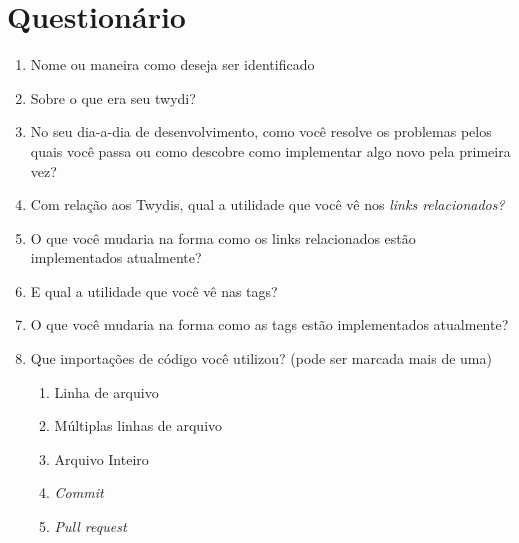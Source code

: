 \apendice
\chapter{Questionário}

\begin{enumerate}
  \item \hspace{1pt} Nome ou maneira como deseja ser identificado

  \item \hspace{1pt} Sobre o que era seu twydi?

  \item \hspace{1pt} No seu dia-a-dia de desenvolvimento, como você resolve os problemas pelos quais você passa ou como descobre como implementar algo novo pela primeira vez?

  \item \hspace{1pt} Com relação aos Twydis, qual a utilidade que você vê nos \textit{links relacionados?}

  \item \hspace{1pt} O que você mudaria na forma como os links relacionados estão implementados atualmente?

  \item \hspace{1pt} E qual a utilidade que você vê nas tags?

  \item \hspace{1pt} O que você mudaria na forma como as tags estão implementados atualmente?

  \item \hspace{1pt} Que importações de código você utilizou? (pode ser marcada mais de uma)
  \begin{enumerate}
    \item \hspace{1pt} Linha de arquivo
    \item \hspace{1pt} Múltiplas linhas de arquivo
    \item \hspace{1pt} Arquivo Inteiro
    \item \hspace{1pt} \textit{Commit}
    \item \hspace{1pt} \textit{Pull request}
  \end{enumerate}


\end{enumerate}
